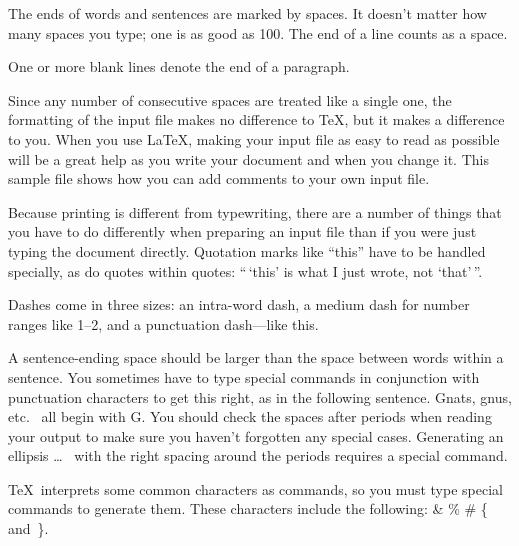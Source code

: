 \documentclass[joc]{ipart}
\theoremstyle{plain}
\begin{document}
The ends  of words and sentences are marked
  by   spaces. It  doesn't matter how many
spaces    you type; one is as good as 100.  The
end of   a line counts as a space.

One   or more   blank lines denote the  end
of  a paragraph.

Since any number of consecutive spaces are treated like a single
one, the formatting of the input file makes no difference to
      \TeX,         %
but it makes a difference to you.
When you use
      \LaTeX,       %
making your input file as easy to read as possible
will be a great help as you write your document and when you
change it.  This sample file shows how you can add comments to
your own input file.

Because printing is different from typewriting, there are a
number of things that you have to do differently when preparing
an input file than if you were just typing the document directly.
Quotation marks like
       ``this''
have to be handled specially, as do quotes within quotes:
       ``\,`this'                  %
    is what I just
    wrote, not  `that'\,''.

Dashes come in three sizes: an
       intra-word
dash, a medium dash for number ranges like
       1--2,
and a punctuation
       dash---like
this.

A sentence-ending space should be larger than the space between words
within a sentence.  You sometimes have to type special commands in
conjunction with punctuation characters to get this right, as in the
following sentence.
       Gnats, gnus, etc.\    %
       all begin with G\@.   %
You should check the spaces after periods when reading your output to
make sure you haven't forgotten any special cases.
Generating an ellipsis
       \ldots\    %
with the right spacing around the periods
requires a special  command.

\TeX\ interprets some common characters as commands, so you must type
special commands to generate them.  These characters include the
following:
       \& \% \# \{ and~\}.
\end{document}
